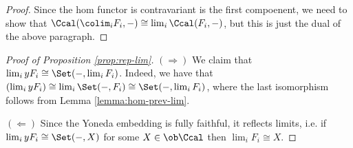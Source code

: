 \begin{solution}
\begin{proof}
        Since the hom functor is contravariant is the first compoenent, we need to show that $\Ccal(\colim_i F_i, -)\cong\lim_i\Ccal(F_i, -)$, but this is just the dual of the above paragraph.
    \end{proof}

    \begin{proof}[Proof of Proposition \ref{prop:rep-lim}]
        $(\Rightarrow)$ We claim that $\lim_i yF_i\cong\Set(-,\lim_i F_i)$. 
        Indeed, we have that $(\lim_i yF_i)\cong \lim_i \Set(-,F_i)\cong\Set(-,\lim_i F_i)$,
        where the last isomorphism follows from Lemma \ref{lemma:hom-prev-lim}.

        $(\Leftarrow)$ Since the Yoneda embedding is fully faithful, it reflects limits, i.e. if $\lim_i yF_i\cong \Set(-,X)$ for some $X\in\ob\Ccal$ then $\lim_i F_i\cong X$.
    \end{proof}
\end{solution}

